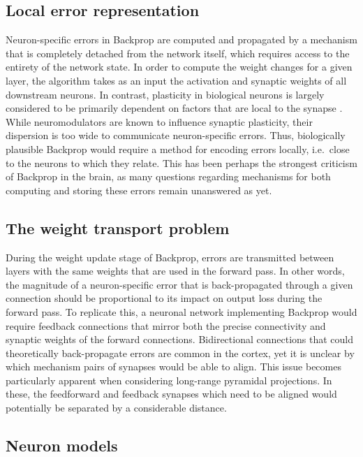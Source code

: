 \subsection{Local error representation}

Neuron-specific errors in Backprop are computed and propagated by a mechanism that is completely detached from the
network itself, which requires access to the entirety of the network state. In order to compute the weight changes for a
given layer, the algorithm takes as an input the activation and synaptic weights of all downstream neurons. In contrast,
plasticity in biological neurons is largely considered to be primarily dependent on factors that are local to the
synapse \citep{Abbott2000,magee2020synaptic,urbanczik2014learning}. While neuromodulators are known to influence
synaptic plasticity, their dispersion is too wide to communicate neuron-specific errors. Thus, biologically plausible
Backprop would require a method for encoding errors locally, i.e.\ close to the neurons to which they relate. This has
been perhaps the strongest criticism of Backprop in the brain, as many questions regarding mechanisms for both computing
and storing these errors remain unanswered as yet.

\subsection{The weight transport problem}

During the weight update stage of Backprop, errors are transmitted between layers with the same weights that are used in
the forward pass. In other words, the magnitude of a neuron-specific error that is back-propagated through a given
connection should be proportional to its impact on output loss during the forward pass. To replicate this, a neuronal
network implementing Backprop would require feedback connections that mirror both the precise connectivity and synaptic
weights of the forward connections. Bidirectional connections that could theoretically back-propagate errors are common
in the cortex, yet it is unclear by which mechanism pairs of synapses would be able to align. This issue becomes
particularly apparent when considering long-range pyramidal projections. In these, the feedforward and feedback synapses
which need to be aligned would potentially be separated by a considerable distance.

\subsection{Neuron models}

